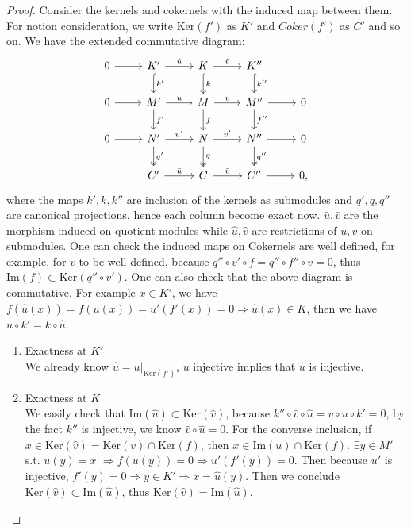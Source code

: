 \documentclass[11pt]{article}
\newcommand{\Lrta}{\Longrightarrow}
\begin{document}
\begin{proof}
Consider the kernels and cokernels with the induced map between them. For notion consideration, we write $\text{Ker}(f')$ as $K'$ and $Coker(f')$ as $C'$ and so on. We have the extended commutative diagram:
\[
\begin{tikzcd}
0\arrow[r]  
& K'  \arrow[r,"\hat{u}"]\arrow[d,"k'",hook] 
& K\arrow[r,"\hat{v}"] \arrow[d,"k",hook] \arrow[ddd,phantom,""{coordinate, name=Z}] 
& K'' \arrow[d,"k''",hook]  
& \\
0\arrow[r]  & M'  \arrow[r,"u"]\arrow[d,"f'"] & M\arrow[r,"v"] \arrow[d,"f"] & M''\arrow[r] \arrow[d,"f''"] & 0 \\
0\arrow[r]  & N'  \arrow[r,"u'"] \arrow[d,"q'",two heads]& N\arrow[r,"v'"] \arrow[d,"q",two heads]& N''\arrow[r]\arrow[d,"q''",two heads]  & 0 \\
  & C'  \arrow[r,"\bar{u}"] & C\arrow[r,"\bar{v}"] & C''\arrow[r]  & 0,
\end{tikzcd}
\]
where the maps $k',k,k''$ are inclusion of the kernels as submodules and $q',q,q''$ are canonical projections, hence each column become exact now. $\bar{u}, \bar{v}$ are the morphism induced on quotient modules while $\hat{u}, \hat{v}$ are restrictions of $u,v$ on submodules. One can check the induced maps on Cokernels are well defined, for example, for $\bar{v}$ to be well defined, because $q''\circ v'\circ f=q''\circ f''\circ v =0$, thus $\text{Im}(f)\subset \text{Ker}(q''\circ v')$. One can also check that the above diagram is commutative. For example $x\in K'$, we have $f(\hat{u}(x))=f(u(x))=u'(f'(x))=0\Lrta \hat{u}(x)\in K$, then we have $u\circ k'=k\circ \hat{u}$. 
\begin{enumerate}
\item Exactness at $K'$\\
We already know $\hat{u}=u|_{\text{Ker}(f')}$, $u$ injective implies that $\hat{u}$ is injective.
\item Exactness at $K$\\
We easily check that $\text{Im}(\hat{u})\subset \text{Ker}(\hat{v})$, because $k''\circ \hat{v}\circ \hat{u}=v\circ u\circ k'=0$, by the fact $k''$ is injective, we know $\hat{v}\circ\hat{u}=0$. For the converse inclusion, if $x\in \text{Ker}(\hat{v})=\text{Ker}(v)\cap \text{Ker}(f)$, then $x\in \text{Im}(u)\cap \text{Ker}(f)$. $\exists y\in M'$ s.t. $u(y)=x$ $\Lrta f(u(y))=0 \Lrta u'(f'(y))=0 $. Then because $u'$ is injective, $f'(y)=0\Lrta y\in K'\Lrta x=\hat{u}(y)$. Then we conclude $\text{Ker}(\hat{v})\subset \text{Im}(\hat{u})$, thus $\text{Ker}(\hat{v})= \text{Im}(\hat{u})$.

\end{enumerate}
\end{proof}
\end{document}
